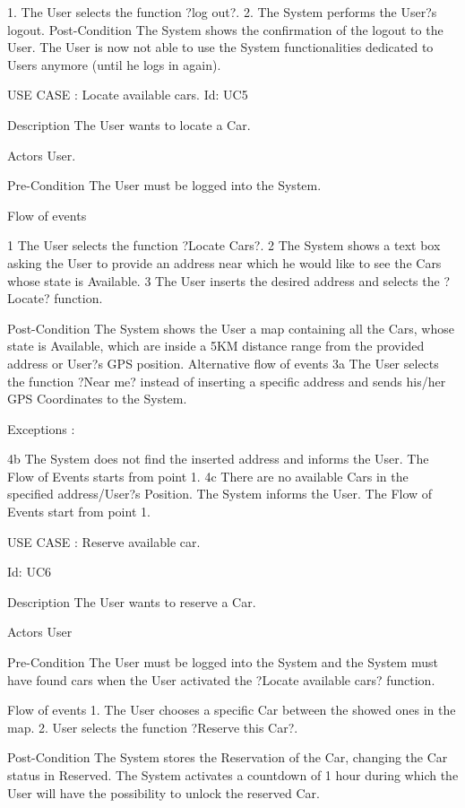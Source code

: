 1. The User selects the function ?log out?.
2. The System performs the User?s logout.
Post-Condition
The System shows the confirmation of the logout to the User.
The User is now not able to use the System functionalities dedicated to Users anymore (until he logs in again).

USE CASE : Locate available cars.
Id:  UC5

Description
The User wants to locate a Car.

Actors
User.

Pre-Condition
The User must be logged into the System.

Flow of events

1 The User selects the function ?Locate Cars?.
2 The System shows a text box asking the User to provide an address near which he would like to see the Cars whose state is Available.
3 The User inserts the desired address and selects the ?Locate? function.

Post-Condition
The System shows the User a map containing all the Cars, whose state is Available, which are inside a 5KM distance range from the provided address or User?s GPS position.
Alternative flow of events
3a 	The User selects the function ?Near me? instead of inserting a specific address and sends his/her GPS Coordinates to the System.

Exceptions :

4b	The System does not find the inserted address and informs the User. The Flow of Events starts from point 1.
4c	There are no available Cars in the specified address/User?s Position. The System informs the User. The Flow of Events start from point 1.

		
USE CASE : Reserve available car.


Id:  UC6


Description
The User wants to reserve a Car.

Actors
User

Pre-Condition
The User must be logged into the System and the System must have found cars when the User activated the ?Locate available cars? function. 


Flow of events
1. The User chooses a specific Car between the showed ones in the map.
2. User selects the function ?Reserve this Car?.

Post-Condition
The System stores the Reservation of the Car, changing the Car status in Reserved.
The System activates a countdown of 1 hour during which the User will have the possibility to unlock the reserved Car.



